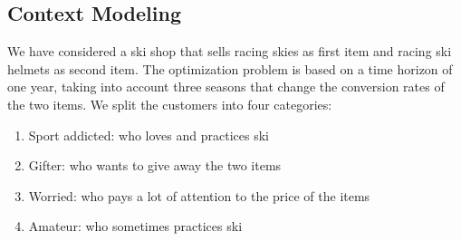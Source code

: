 \subsection{Context Modeling}
We have considered a ski shop that sells racing skies as first item and racing ski helmets as second item. The optimization problem is based on a time horizon of one year, taking into account three seasons that change the conversion rates of the two items. We split the customers into four categories:
\begin{enumerate}
	\item Sport addicted: who loves and practices ski
	\item Gifter: who wants to give away the two items
	\item Worried: who pays a lot of attention to the price of the items
	\item Amateur: who sometimes practices ski
\end{enumerate}

